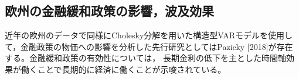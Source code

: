 \documentclass[12pt]{jarticle}
\begin{document}
{%



\newpage
\subsection{欧州の金融緩和政策の影響，波及効果}

近年の欧州のデータで同様にCholesky分解を用いた構造型VARモデルを使用して，金融政策の物価への影響を分析した先行研究としてはPazicky [2018]が存在する。金融緩和政策の有効性については，
長期金利の低下を主とした時間軸効果が働くことで長期的に経済に働くことが示唆されている。

}
\end{document}
